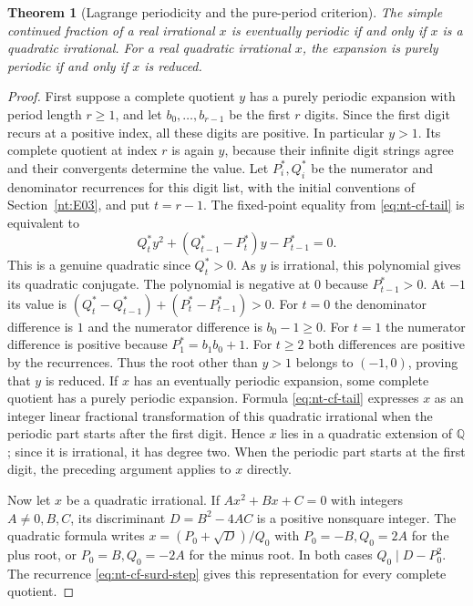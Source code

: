 \documentclass[11pt,oneside,openany]{book}
\theoremstyle{plain}
\newtheorem{theorem}{Theorem}[chapter]
\theoremstyle{definition}
\theoremstyle{remark}
\begin{document}
\begin{theorem}[Lagrange periodicity and the pure-period criterion]
\label{nt:E08}
The simple continued fraction of a real irrational \(x\) is
eventually periodic if and only if \(x\) is a quadratic irrational.
For a real quadratic irrational \(x\), the expansion is purely
periodic if and only if \(x\) is reduced.
\end{theorem}
\begin{proof}
First suppose a complete quotient \(y\) has a purely periodic expansion
with period length \(r\ge1\), and let \(b_0,\ldots,b_{r-1}\) be the
first \(r\) digits. Since the first digit recurs at a positive index,
all these digits are positive. In particular \(y>1\). Its complete
quotient at index \(r\) is again \(y\), because their infinite digit
strings agree and their convergents determine the value. Let
\(P_i^\ast,Q_i^\ast\) be the numerator and denominator recurrences for
this digit list, with the initial conventions of
Section~\ref{nt:E03}, and put \(t=r-1\). The fixed-point equality
from \eqref{eq:nt-cf-tail} is equivalent to
\[
 Q_t^\ast y^2+(Q_{t-1}^\ast-P_t^\ast)y-P_{t-1}^\ast=0.
\]
This is a genuine quadratic since \(Q_t^\ast>0\). As \(y\) is
irrational, this polynomial gives its quadratic conjugate.
The polynomial is negative at \(0\) because \(P_{t-1}^\ast>0\).
At \(-1\) its value is
\((Q_t^\ast-Q_{t-1}^\ast)+(P_t^\ast-P_{t-1}^\ast)>0\).
For \(t=0\) the denominator difference is \(1\) and the numerator
difference is \(b_0-1\ge0\). For \(t=1\) the numerator difference is
positive because \(P_1^\ast=b_1b_0+1\). For \(t\ge2\) both differences
are positive by the recurrences. Thus the root other than \(y>1\)
belongs to \((-1,0)\), proving that \(y\) is reduced.
If \(x\) has an eventually periodic expansion, some complete quotient
has a purely periodic expansion. Formula \eqref{eq:nt-cf-tail}
expresses \(x\) as an integer linear fractional transformation of this
quadratic irrational when the periodic part starts after the first
digit. Hence \(x\) lies in a quadratic extension of \(\mathbb Q\);
since it is irrational, it has degree two. When the periodic part
starts at the first digit, the preceding argument applies to \(x\)
directly.

Now let \(x\) be a quadratic irrational. If \(Ax^2+Bx+C=0\)
with integers \(A\ne0,B,C\), its discriminant
\(D=B^2-4AC\) is a positive nonsquare integer. The quadratic formula
writes \(x=(P_0+\sqrt D)/Q_0\) with \(P_0=-B,Q_0=2A\) for the
plus root, or \(P_0=B,Q_0=-2A\) for the minus root. In both cases
\(Q_0\mid D-P_0^2\). The recurrence
\eqref{eq:nt-cf-surd-step} gives this representation for every complete
quotient.


\end{proof}
\end{document}
